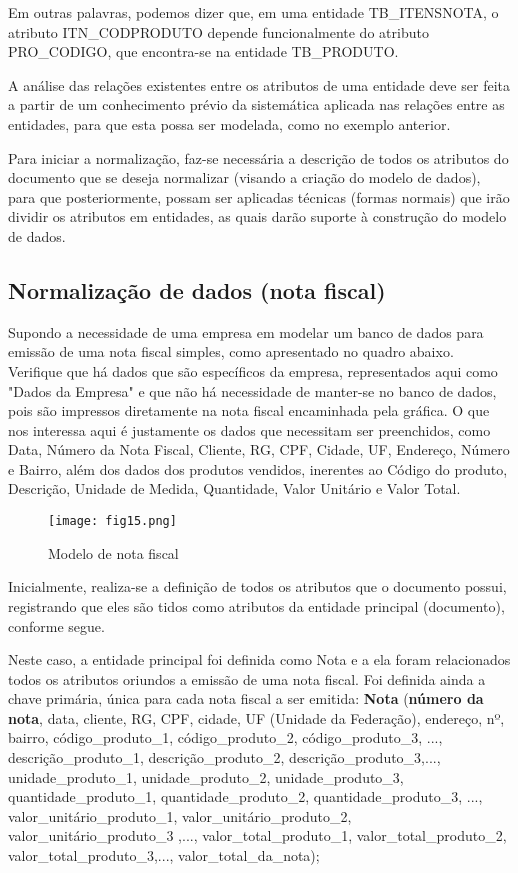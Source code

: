 \documentclass{article}
\begin{document}
Em outras palavras, podemos dizer que, em uma entidade TB\_ITENSNOTA, o atributo ITN\_CODPRODUTO depende funcionalmente do atributo PRO\_CODIGO, que encontra-se na entidade TB\_PRODUTO.

A análise das relações existentes entre os atributos de uma entidade deve ser feita a partir de um conhecimento prévio da sistemática aplicada nas relações entre as entidades, para que esta possa ser modelada, como no exemplo anterior.

Para iniciar a normalização, faz-se necessária a descrição de todos os atributos do documento que se deseja normalizar (visando a criação do modelo de dados), para que posteriormente, possam ser aplicadas técnicas (formas normais) que irão dividir os atributos em entidades, as quais darão suporte à construção do modelo de dados.

\subsection{Normalização de dados (nota fiscal)}
Supondo a necessidade de uma empresa em modelar um banco de dados para emissão de uma nota fiscal simples, como apresentado no quadro abaixo. Verifique que há dados que são específicos da empresa, representados aqui como "Dados da Empresa" e que não há necessidade de manter-se no banco de dados, pois são impressos diretamente na nota fiscal encaminhada pela gráfica. O que nos interessa aqui é justamente os dados que necessitam ser preenchidos, como Data, Número da Nota Fiscal, Cliente, RG, CPF, Cidade, UF, Endereço, Número e Bairro, além dos dados dos produtos vendidos, inerentes ao Código do produto, Descrição, Unidade de Medida, Quantidade, Valor Unitário e Valor Total.

\begin{figure}[H]
    \centering
    \texttt{[image: fig15.png]}
    \caption{Modelo de nota fiscal}
    \label{fig:fig15}
\end{figure}

Inicialmente, realiza-se a definição de todos os atributos que o documento possui, registrando que eles são tidos como atributos da entidade principal (documento), conforme segue.

Neste caso, a entidade principal foi definida como Nota e a ela foram relacionados todos os atributos oriundos a emissão de uma nota fiscal. Foi definida ainda a chave primária, única para cada nota fiscal a ser emitida:
\textbf{Nota} (\textbf{número da nota}, data, cliente, RG, CPF, cidade, UF (Unidade da Federação), endereço, nº, bairro, código\_produto\_1, código\_produto\_2, código\_produto\_3, ..., descrição\_produto\_1, descrição\_produto\_2, descrição\_produto\_3,..., unidade\_produto\_1, unidade\_produto\_2, unidade\_produto\_3, quantidade\_produto\_1, quantidade\_produto\_2, quantidade\_produto\_3, ..., valor\_unitário\_produto\_1, valor\_unitário\_produto\_2, valor\_unitário\_produto\_3 ,..., valor\_total\_produto\_1, valor\_total\_produto\_2, valor\_total\_produto\_3,..., valor\_total\_da\_nota);
\end{document}
